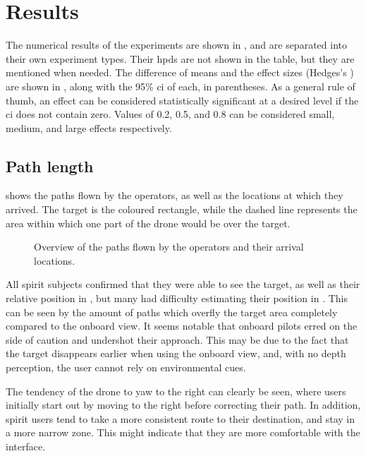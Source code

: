 \chapter{Results}
\label{ch:results}
The numerical results of the experiments are shown in , and are separated into their own experiment types.
Their \glspl{hpd} are not shown in the table, but they are mentioned when needed.
The difference of means and the effect sizes (Hedges's ) are shown in , along with the 95\% \gls{ci} of each, in parentheses.
As a general rule of thumb, an effect can be considered statistically significant at a desired level if the \gls{ci} does not contain zero.
Values of 0.2, 0.5, and 0.8 can be considered small, medium, and large effects respectively.

  \section{Path length}
   shows the paths flown by the operators, as well as the locations at which they arrived.
  The target is the coloured rectangle, while the dashed line represents the area within which one part of the drone would be over the target.

  \begin{figure}[h]
    \centering
    
    \caption[Paths overview]{Overview of the paths flown by the operators and their arrival locations.}
    \label{fig:paths_overview}
  \end{figure}

  All \gls{spirit} subjects confirmed that they were able to see the target, as well as their relative position in , but many had difficulty estimating their position in .
  This can be seen by the amount of paths which overfly the target area completely compared to the onboard view.
  It seems notable that onboard pilots erred on the side of caution and undershot their approach.
  This may be due to the fact that the target disappears earlier when using the onboard view, and, with no depth perception, the user cannot rely on environmental cues.

  The tendency of the drone to yaw to the right can clearly be seen, where users initially start out by moving to the right before correcting their path.
  In addition, \gls{spirit} users tend to take a more consistent route to their destination, and stay in a more narrow zone.
  This might indicate that they are more comfortable with the interface.


